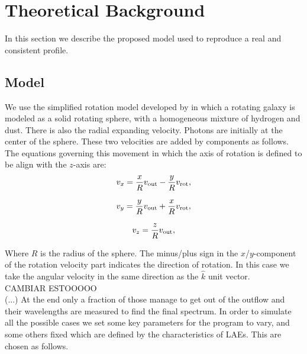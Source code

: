 \documentclass{latex/emulateapj}
\begin{document}
\section{Theoretical Background}
\label{sec:theo}
In this section we describe the proposed model used to reproduce a real and consistent \lya profile. \\ 

\subsection{Model}

We use the simplified rotation model developed by \citep{Garavito14} in which a rotating galaxy is modeled as a solid rotating sphere, with a homogeneous mixture of hydrogen and dust. There is also the radial expanding velocity. Photons are initially at the center of the sphere. These two velocities are added by components as follows. The equations governing this movement in which the axis of rotation is defined to be align with the $z$-axis are: \\

\begin{equation}
v_{x}=\frac{x}{R}v_{\rm out}-\frac{y}{R}v_{\rm rot}, \label{subeq1}
\end{equation}

\begin{equation}
v_{y}=\frac{y}{R}v_{\rm out}+\frac{x}{R}v_{\rm rot}, \label{subeq2}
\end{equation}

\begin{equation}
v_{z}=\frac{z}{R}v_{\rm out}, \label{subeq3}
\end{equation}

Where $R$ is the radius of the sphere. The minus/plus sign in the $x$/$y$-component of the rotation velocity part indicates the direction of rotation. In this case we take the angular velocity in the same direction as the $\hat{k}$ unit vector. \\

CAMBIAR ESTOOOOO\\ 

(...) At the end only a fraction of those manage to get out of the outflow and their wavelengths are measured to find the final spectrum. In order to simulate all the possible cases we set some key parameters for the program to vary, and some others fixed which are defined by the characteristics of LAEs. This are chosen as follows.\\
\end{document}
